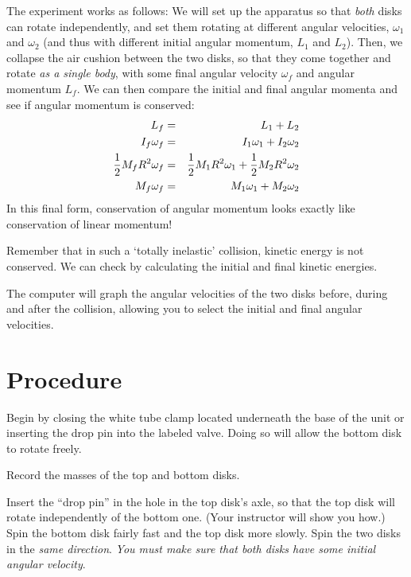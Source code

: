 The experiment works as follows:  We will set up the apparatus so that
{\em both} disks can rotate independently, and set them rotating at different
angular velocities, ${\omega}_1$ and ${\omega}_2$ (and thus with different
initial angular
momentum, ${L}_1$ and ${L}_2$).  Then, we collapse the air cushion between the two disks, so
that they come together and rotate {\em as a single body}, with some
final angular velocity ${\omega}_f$ and angular momentum ${L}_f$.  We can then
compare the initial and final angular momenta and see if
angular momentum is conserved:
\begin{eqnarray}
L_f &=& L_1+L_2 \label{eq:Lconserved1}\\
I_f \omega_f &=& I_1\omega_1+I_2\omega_2 \label{eq:Lconserved2}\\
{1\over2}M_f R^2 \omega_f &=& {1\over2}M_1 R^2\omega_1+{1\over2}M_2 R^2\omega_2 \label{eq:Lconserved3}\\
M_f  \omega_f &=& M_1 \omega_1+M_2 \omega_2 \label{eq:Lconserved4}
\end{eqnarray}
In this final form, conservation of angular momentum looks exactly like
conservation of linear momentum!

Remember that in such a `totally inelastic' collision, kinetic energy is not
conserved.  We can check by calculating the initial and
final kinetic energies.  %

The computer will graph the angular velocities of the
two disks before, during and after the collision, allowing  you to select the initial and final
angular velocities.  %

\section*{Procedure}
Begin by closing the white tube clamp located underneath the base of the unit or
inserting the drop pin into the labeled valve.
Doing so will allow the bottom disk to rotate freely.

Record the masses %
of the top and bottom disks.%

Insert the ``drop pin'' in the hole in the top disk's axle, so that the top
disk will rotate independently of the bottom one.  (Your instructor
will show you how.) Spin the bottom disk fairly fast and the top disk
more slowly.  Spin the two disks in the {\em same direction}.  {\em
You must make sure that both disks have some initial angular
velocity}.

